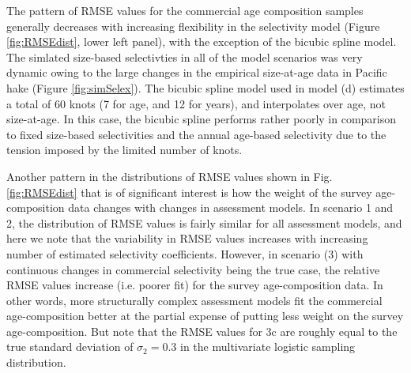 The pattern of RMSE values for the commercial age composition samples generally decreases with increasing flexibility in the selectivity model (Figure \ref{fig:RMSEdist}, lower left panel), with the exception of the bicubic spline model.  The simlated size-based selectivties in all of the model scenarios was very dynamic owing to the large changes in the empirical size-at-age data in Pacific hake (Figure \ref{fig:simSelex}). The bicubic spline model used in model (d) estimates a total of 60 knots (7 for age, and 12 for years), and interpolates over age, not size-at-age.  In this case, the bicubic spline performs rather poorly in comparison to fixed size-based selectivities and the annual age-based selectivity due to the tension imposed by the limited number of knots.

Another pattern in the distributions of RMSE values shown in Fig. \ref{fig:RMSEdist} that is of significant interest is how the weight of the survey age-composition data changes with changes in assessment models.  In scenario 1 and 2, the distribution of RMSE values is fairly similar for all assessment models, and here we note that the variability in RMSE values increases with increasing number of estimated selectivity coefficients.  However, in scenario (3) with continuous changes in commercial selectivity being the true case, the relative RMSE values increase (i.e. poorer fit) for the survey age-composition data.  In other words, more structurally complex assessment models fit the commercial age-composition better at the partial expense of putting less weight on the survey age-composition.  But note that the RMSE values for 3c are roughly equal to the true standard deviation of $\sigma_2=0.3$ in the multivariate logistic sampling distribution.



